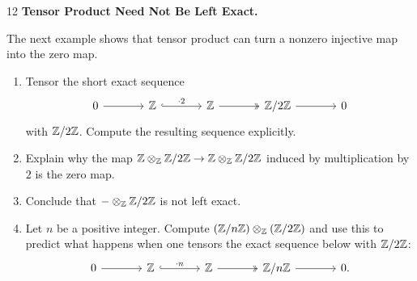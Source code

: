\documentclass[Notebook.tex]{subfiles}
\begin{document}
\newpage 

\begin{problem}{12} \textbf{Tensor Product Need Not Be Left Exact.} 
    
    The next example shows that tensor product can turn a nonzero injective map into the zero map.
    \begin{enumerate}
    \item Tensor the short exact sequence
        \[
        \begin{tikzcd}[column sep=large]
        0 \arrow[r] & \Z \arrow[r, hook, "\cdot 2"] & \Z \arrow[r, two heads] & \Z/2\Z \arrow[r] & 0
        \end{tikzcd}
        \]
        with $\mathbb Z/2\mathbb Z$. Compute the resulting sequence explicitly.
        \item Explain why the map $\mathbb Z\otimes_{\mathbb Z}\mathbb Z/2\mathbb Z \to \mathbb Z\otimes_{\mathbb Z}\mathbb Z/2\mathbb Z$ induced by multiplication by $2$ is the zero map.
        \item Conclude that $-\otimes_{\mathbb Z}\mathbb Z/2\mathbb Z$ is not left exact.
        \item Let $n$ be a positive integer. Compute $(\mathbb Z/n\mathbb Z)\otimes_{\mathbb Z}(\mathbb Z/2\mathbb Z)$ and use this to predict what happens when one tensors the exact sequence below with $\mathbb Z/2\mathbb Z$:
        \[
        \begin{tikzcd}[column sep=large]
        0 \arrow[r] & \Z \arrow[r, hook, "\cdot n"] & \Z \arrow[r, two heads] & \Z/n\Z \arrow[r] & 0.
        \end{tikzcd}
        \]
    \end{enumerate}
\end{problem}
\end{document}
